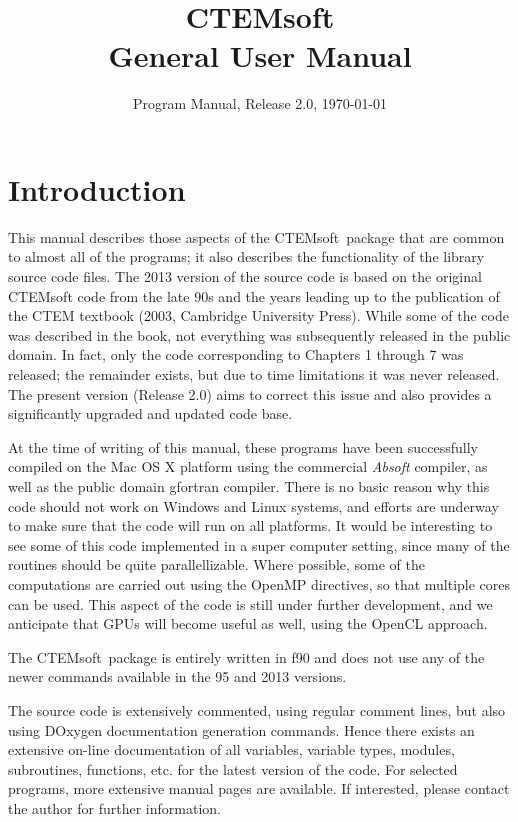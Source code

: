 \documentclass[DIV=calc, paper=letter, fontsize=11pt]{scrartcl}	 %
\title{CTEMsoft\\ General User Manual} %
\author{\vspace*{-0.7in}} %
\date{Program Manual, Release 2.0, \today}
\newcommand{\ctp}{\textsf{CTEMsoft}}
\begin{document}
\maketitle

\renewcommand{\contentsname}{Table of Contents}
{\small\tableofcontents}

\newpage
\section{Introduction}
This manual describes those aspects of the \ctp\ package that are common to almost all of the programs; it also describes the functionality of 
the library source code files.  The 2013 version of the source code is based on the original CTEMsoft code from the late 90s and the years 
leading up to the publication of the CTEM textbook (2003, Cambridge University Press).  While some of the code was described in the 
book, not everything was subsequently released in the public domain.  In fact, only the code corresponding to Chapters 1 through 7 was 
released; the remainder exists, but due to time limitations it was never released.  The present version (Release 2.0) aims to correct this issue and also
provides a significantly upgraded and updated code base.  

At the time of writing of this manual, these programs have been successfully compiled on the Mac OS X platform using the commercial \textit{Absoft} compiler,
as well as the public domain gfortran compiler.  There is no basic reason why this code should not work on Windows and Linux systems, and efforts are underway
to make sure that the code will run on all platforms. It would be interesting to see some of this code
implemented in a super computer setting, since many of the routines should be quite parallellizable.  Where possible, some of the computations
are carried out using the OpenMP directives, so that multiple cores can be used.  This aspect of the code is still under further development,
and we anticipate that GPUs will become useful as well, using the OpenCL approach.

The \ctp\ package is entirely written in f90 and does not use any of the newer commands available in the 95 and 2013 versions.

The source code is extensively commented, using regular comment lines, but also using DOxygen documentation generation commands.  Hence
there exists an extensive on-line documentation of all variables, variable types, modules, subroutines, functions, etc. for the latest version 
of the code.  For selected programs, more extensive manual pages are available.  If interested, please contact the author for further information.
\end{document}
